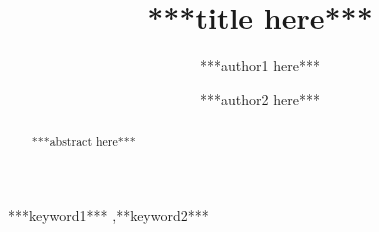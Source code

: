 \documentclass[final,3p,times,twocolumn]{elsarticle}
\begin{document}
\begin{frontmatter} \title{***title here***}

	\author[affiliation]{***author1 here***}
	 

	\author[affiliation]{***author2 here***}

	\address[affiliation]{***institution + address***}

	\begin{abstract}
	***abstract here***
	\end{abstract}

	\begin{keyword} ***keyword1*** \sep ***keyword2***
	\end{keyword}
\end{frontmatter}


\end{document}
